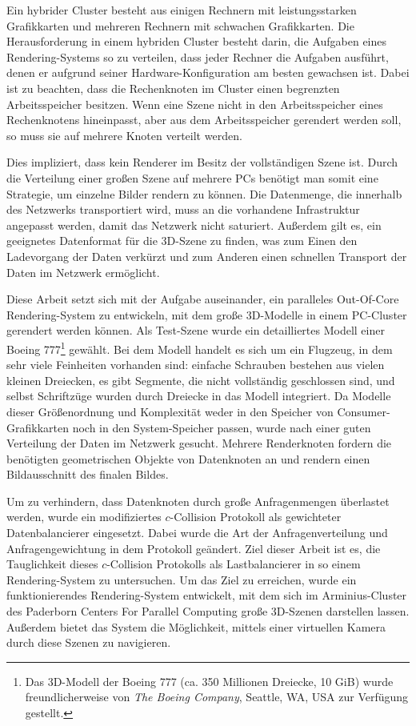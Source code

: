 Ein hybrider Cluster besteht aus einigen Rechnern mit leistungsstarken Grafikkarten und mehreren Rechnern mit schwachen Grafikkarten. Die Herausforderung in einem hybriden Cluster besteht darin, die Aufgaben eines Rendering-Systems so zu verteilen, dass jeder Rechner die Aufgaben ausführt, denen er aufgrund seiner Hardware-Konfiguration am besten gewachsen ist. Dabei ist zu beachten, dass die Rechenknoten im Cluster einen begrenzten Arbeitsspeicher besitzen. Wenn eine Szene nicht in den Arbeitsspeicher eines Rechenknotens hineinpasst, aber aus dem Arbeitsspeicher gerendert werden soll, so muss sie auf mehrere Knoten verteilt werden. 

Dies impliziert, dass kein Renderer im Besitz der vollständigen Szene ist. Durch die Verteilung einer großen Szene auf mehrere PCs benötigt man somit eine Strategie, um einzelne Bilder rendern zu können. Die Datenmenge, die innerhalb des Netzwerks transportiert wird, muss an die vorhandene Infrastruktur angepasst werden, damit das Netzwerk nicht saturiert. Außerdem gilt es, ein geeignetes Datenformat für die 3D-Szene zu finden, was zum Einen den Ladevorgang der Daten verkürzt und zum Anderen einen schnellen Transport der Daten im Netzwerk ermöglicht.
\medskip

Diese Arbeit setzt sich mit der Aufgabe auseinander, ein paralleles Out-Of-Core Rendering-System zu entwickeln, mit dem große 3D-Modelle in einem PC-Cluster gerendert werden können. Als Test-Szene wurde ein detailliertes Modell einer Boeing 777\footnote{Das 3D-Modell der Boeing 777 (ca. 350 Millionen Dreiecke, 10 GiB) wurde freundlicherweise von \textit{The Boeing Company}, Seattle, WA, USA zur Verfügung gestellt.} gewählt. Bei dem Modell handelt es sich um ein Flugzeug, in dem sehr viele Feinheiten vorhanden sind: einfache Schrauben bestehen aus vielen kleinen Dreiecken, es gibt Segmente, die nicht vollständig geschlossen sind, und selbst Schriftzüge wurden durch Dreiecke in das Modell integriert. Da Modelle dieser Größenordnung und Komplexität weder in den Speicher von Consumer-Grafikkarten noch in den System-Speicher passen, wurde nach einer guten Verteilung der Daten im Netzwerk gesucht. Mehrere Renderknoten fordern die benötigten geometrischen Objekte von Datenknoten an und rendern einen Bildausschnitt des finalen Bildes.


Um zu verhindern, dass Datenknoten durch große Anfragenmengen überlastet werden, wurde ein modifiziertes $c$-Collision Protokoll als gewichteter Datenbalancierer eingesetzt. Dabei wurde die Art der Anfragenverteilung und Anfragengewichtung in dem Protokoll geändert. Ziel dieser Arbeit ist es, die Tauglichkeit dieses $c$-Collision Protokolls als Lastbalancierer in so einem Rendering-System zu untersuchen. Um das Ziel zu erreichen, wurde ein funktionierendes Rendering-System entwickelt, mit dem sich im Arminius-Cluster des Paderborn Centers For Parallel Computing große 3D-Szenen darstellen lassen. Außerdem bietet das System die Möglichkeit, mittels einer virtuellen Kamera durch diese Szenen zu navigieren. 

